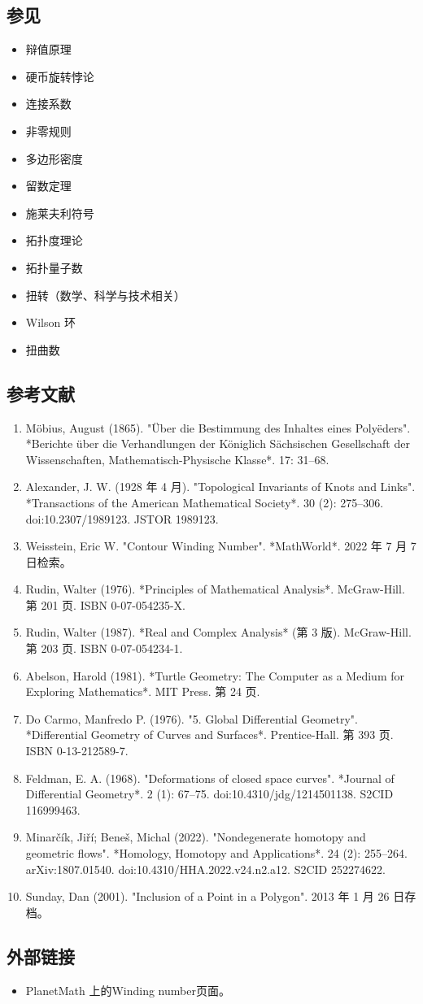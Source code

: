 \subsection{参见}
\begin{itemize}
\item 辩值原理
\item 硬币旋转悖论
\item 连接系数
\item 非零规则
\item 多边形密度
\item 留数定理
\item 施莱夫利符号
\item 拓扑度理论
\item 拓扑量子数
\item 扭转（数学、科学与技术相关）
\item Wilson 环
\item 扭曲数
\end{itemize}
\subsection{参考文献}
\begin{enumerate}
\item Möbius, August (1865). "Über die Bestimmung des Inhaltes eines Polyëders". *Berichte über die Verhandlungen der Königlich Sächsischen Gesellschaft der Wissenschaften, Mathematisch-Physische Klasse*. 17: 31–68.
\item Alexander, J. W. (1928 年 4 月). "Topological Invariants of Knots and Links". *Transactions of the American Mathematical Society*. 30 (2): 275–306. doi:10.2307/1989123. JSTOR 1989123.
\item Weisstein, Eric W. "Contour Winding Number". *MathWorld*. 2022 年 7 月 7 日检索。
\item Rudin, Walter (1976). *Principles of Mathematical Analysis*. McGraw-Hill. 第 201 页. ISBN 0-07-054235-X.
\item Rudin, Walter (1987). *Real and Complex Analysis* (第 3 版). McGraw-Hill. 第 203 页. ISBN 0-07-054234-1.
\item Abelson, Harold (1981). *Turtle Geometry: The Computer as a Medium for Exploring Mathematics*. MIT Press. 第 24 页.
\item Do Carmo, Manfredo P. (1976). "5. Global Differential Geometry". *Differential Geometry of Curves and Surfaces*. Prentice-Hall. 第 393 页. ISBN 0-13-212589-7.
\item Feldman, E. A. (1968). "Deformations of closed space curves". *Journal of Differential Geometry*. 2 (1): 67–75. doi:10.4310/jdg/1214501138. S2CID 116999463.
\item Minarčík, Jiří; Beneš, Michal (2022). "Nondegenerate homotopy and geometric flows". *Homology, Homotopy and Applications*. 24 (2): 255–264. arXiv:1807.01540. doi:10.4310/HHA.2022.v24.n2.a12. S2CID 252274622.
\item Sunday, Dan (2001). "Inclusion of a Point in a Polygon". 2013 年 1 月 26 日存档。
\end{enumerate}
\subsection{外部链接}
\begin{itemize}
\item PlanetMath 上的Winding number页面。
\end{itemize}
